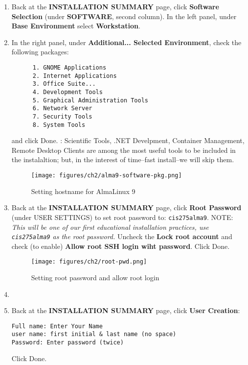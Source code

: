 \begin{enumerate}
\item Back at the {\bf{INSTALLATION SUMMARY}} page, click {\bf{Software Selection}} (under {\bf{SOFTWARE}}, second column). In the left panel, under {\bf{Base Environment}} select {\bf{Workstation}}. 
\item In the right panel, under {\bf{Additional... Selected Environment}}, check the following packages: 
\begin{verbatim}
      1. GNOME Applications 
      2. Internet Applications 
      3. Office Suite...
      4. Development Tools
      5. Graphical Administration Tools
      6. Network Server
      7. Security Tools 
      8. System Tools
\end{verbatim}
and click Done. : Scientific Tools, .NET Develpment, Container Management, Remote Desktop Clients are among the most useful tools to be included in the instalaltion; but, in the interest of time--fast install--we will skip them. 

\begin{figure}[hbt!]\centering
   \texttt{[image: figures/ch2/alma9-software-pkg.png]}
   \caption{Setting hostname for AlmaLinux 9} \label{fig:install-alma9-pkg} %
\end{figure}

\item Back at the {\bf{INSTALLATION SUMMARY}} page, click {\bf{Root Password}} (under USER SETTINGS) to set root password to: {\tt{cis275alma9}}. NOTE: {\it{This will be one of our first educational installation practices, use {\tt{cis275alma9}} as the root password.}} Uncheck the {\bf{Lock root account}} and check (to enable) {\bf{Allow root SSH login wiht password}}. Click Done. 

\begin{figure}[hbt!]\centering
   \texttt{[image: figures/ch2/root-pwd.png]}
   \caption{Setting root password and allow root login} \label{fig:alma9-root-pwd} %
\end{figure}

\item \item Back at the {\bf{INSTALLATION SUMMARY}} page, click {\bf{User Creation}}: 
\begin{verbatim} 
Full name: Enter Your Name 
user name: first initial & last name (no space) 
Password: Enter password (twice) 
\end{verbatim} 
Click Done. 


\end{enumerate}
